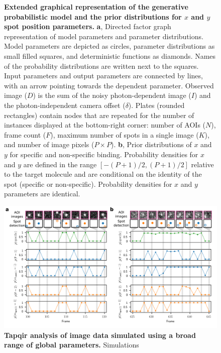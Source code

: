 \begin{figure} [t]
\caption{\textbf{Extended graphical representation of the generative probabilistic model and the prior distributions for $x$ and $y$ spot position parameters.} \textbf{a}, Directed factor graph representation \cite{Bishop2006-oa} of model parameters and parameter distributions. Model parameters are depicted as circles, parameter distributions as small filled squares, and deterministic functions as diamonds. Names of the probability distributions are written next to the squares. Input parameters and output parameters are connected by lines, with an arrow pointing towards the dependent parameter. Observed image ($D$) is the sum of the noisy photon-dependent image ($I$) and the photon-independent camera offset ($\delta$). Plates (rounded rectangles) contain nodes that are repeated for the number of instances displayed at the bottom-right corner: number of AOIs ($N$), frame count ($F$), maximum number of spots in a single image ($K$), and number of image pixels ($P \times P$). \textbf{b}, Prior distributions of $x$ and $y$ for specific and non-specific binding. Probability densities for $x$ and $y$ are defined in the range $\left[ -(P+1)/2, (P+1)/2 \right] $ relative to the target molecule and are conditional on the identity of the spot (specific or non-specific).  Probability densities for $x$ and $y$ parameters are identical. }
\end{figure}
\clearpage

\begin{figure}[h]
\centering
\includegraphics[width=\textwidth]{extended-data/figure2/figure2.png}
\caption{\textbf{Tapqir analysis of image data simulated using a broad range of global parameters.} Simulations }
\label{fig:tapqir_global}
\end{figure}
\pagebreak

